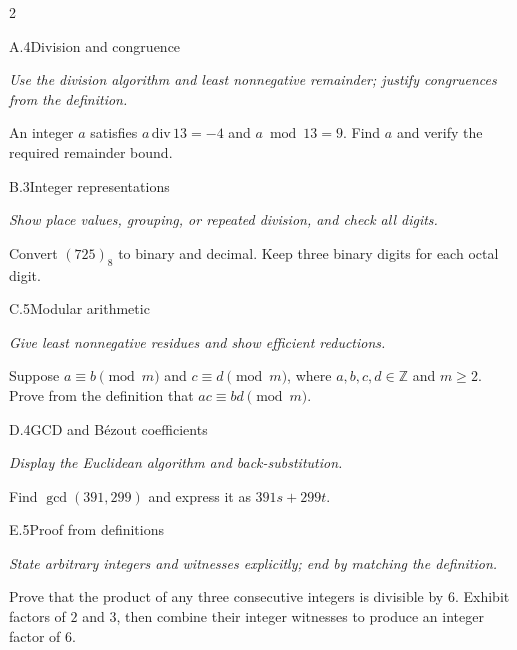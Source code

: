 \documentclass[9pt]{extarticle}
\begin{document}
\begin{multicols}{2}
\begin{CoreProblem}{A.4}{Division and congruence}
{\scriptsize\textit{Use the division algorithm and least nonnegative remainder; justify congruences from the definition.}\par}
An integer $a$ satisfies $a\,\mathrm{div}\,13=-4$ and $a\bmod13=9$.
Find $a$ and verify the required remainder bound.
\end{CoreProblem}
\begin{CoreProblem}{B.3}{Integer representations}
{\scriptsize\textit{Show place values, grouping, or repeated division, and check all digits.}\par}
Convert $(725)_8$ to binary and decimal. Keep three binary digits for each
octal digit.
\end{CoreProblem}
\begin{CoreProblem}{C.5}{Modular arithmetic}
{\scriptsize\textit{Give least nonnegative residues and show efficient reductions.}\par}
Suppose $a\equiv b\pmod m$ and $c\equiv d\pmod m$, where
$a,b,c,d\in\mathbb Z$ and $m\ge2$. Prove from the definition that
$ac\equiv bd\pmod m$.
\end{CoreProblem}
\columnbreak
\begin{CoreProblem}{D.4}{GCD and B\'ezout coefficients}
{\scriptsize\textit{Display the Euclidean algorithm and back-substitution.}\par}
Find $\gcd(391,299)$ and express it as $391s+299t$.
\end{CoreProblem}
\begin{CoreProblem}{E.5}{Proof from definitions}
{\scriptsize\textit{State arbitrary integers and witnesses explicitly; end by matching the definition.}\par}
Prove that the product of any three consecutive integers is divisible by $6$.
Exhibit factors of $2$ and $3$, then combine their integer witnesses to
produce an integer factor of $6$.
\end{CoreProblem}
\end{multicols}
\CoreWorkArea
\FormBreak
{}
\end{document}
